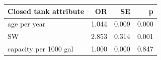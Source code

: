 \begin{tabular}{lrrr}
\toprule
Closed tank attribute & OR & SE & p \\
\midrule
age per year & 1.044 & 0.009 & 0.000 \\
SW & 2.853 & 0.314 & 0.001 \\
capacity per 1000 gal & 1.000 & 0.000 & 0.847 \\
\bottomrule
\end{tabular}
